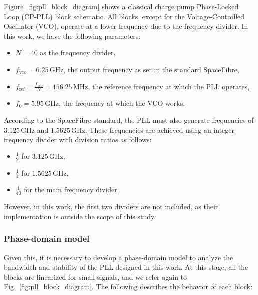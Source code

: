 \documentclass[lettersize,journal]{IEEEtran}
\begin{document}
Figure~\ref{fig:pll_block_diagram} shows a classical charge pump Phase-Locked Loop (CP-PLL) block schematic. All blocks, except for the Voltage-Controlled Oscillator (VCO), operate at a lower frequency due to the frequency divider. In this work, we have the following parameters:

\begin{itemize}
    \item \( N = 40 \) as the frequency divider,
    \item \( f_{\text{vco}} = 6.25 \, \text{GHz} \), the output frequency as set in the standard SpaceFibre,
    \item \( f_{\text{ref}} = \frac{f_{\text{vco}}}{N} = 156.25 \, \text{MHz} \), the reference frequency at which the PLL operates,
    \item \( f_0 = 5.95 \, \text{GHz} \), the frequency at which the VCO works.
\end{itemize}

According to the SpaceFibre standard, the PLL must also generate frequencies of \( 3.125 \, \text{GHz} \) and \( 1.5625 \, \text{GHz} \). These frequencies are achieved using an integer frequency divider with division ratios as follows:

\begin{itemize}
    \item \( \frac{1}{2} \) for \( 3.125 \, \text{GHz} \),
    \item \( \frac{1}{4} \) for \( 1.5625 \, \text{GHz} \),
    \item \( \frac{1}{40} \) for the main frequency divider.
\end{itemize}

However, in this work, the first two dividers are not included, as their implementation is outside the scope of this study.

\subsubsection{Phase-domain model}
Given this, it is necessary to develop a phase-domain model to analyze the bandwidth and stability of the PLL designed in this work. At this stage, all the blocks are linearized for small signals, and we refer again to Fig.~\ref{fig:pll_block_diagram}. The following describes the behavior of each block:
\end{document}
